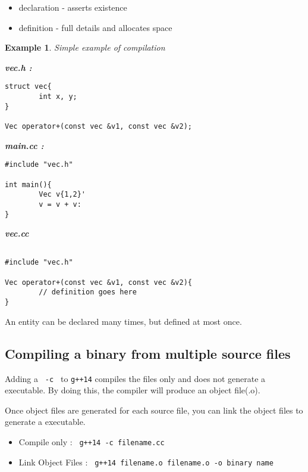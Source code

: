 \documentclass{article}
\newtheorem{ex}[theorem]{Example}
\newenvironment{cblock}[1]{%
    \tcolorbox[beamer,%
    noparskip,breakable,
    colback=lightblue,colframe=darkblue,%
    colbacklower=darkblue!75!lightblue,%
    title=#1]}%
    {\endtcolorbox}
\begin{document}
\begin{cblock} {Recall}
\begin{itemize}
\item declaration - asserts existence
\item definition - full details and allocates space 
\end{itemize}
\end{cblock}

\begin{ex} Simple example of compilation 

\textbf{vec.h :}
\begin{lstlisting}
struct vec{
		int x, y;
}

Vec operator+(const vec &v1, const vec &v2);
\end{lstlisting}

\textbf{main.cc :}
\begin{lstlisting}
#include "vec.h"

int main(){
		Vec v{1,2}'
		v = v + v:
}
\end{lstlisting}

\textbf{vec.cc}
\begin{lstlisting}

#include "vec.h"

Vec operator+(const vec &v1, const vec &v2){
		// definition goes here 
}

\end{lstlisting}
\end{ex}

\begin{cblock}{Recall :}
An entity can be declared many times, but defined at most once.
\end{cblock}

\subsection{Compiling a binary from multiple source files}
Adding a \verb| -c | to \verb|g++14| compiles the files only and does not generate a executable. By doing this, the compiler will produce an object file(.o). 

Once object files are generated for each source file, you can link the object files to generate a executable. 

\begin{itemize}
\item Compile only : \verb| g++14 -c filename.cc|
\item Link Object Files : \verb| g++14 filename.o filename.o -o binary name|
\end{itemize}
\end{document}
